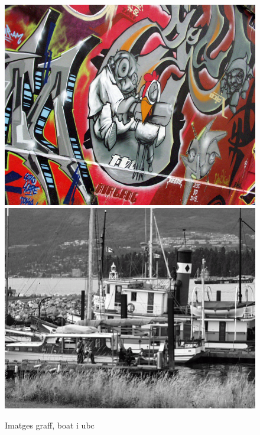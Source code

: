 		\begin{figure}[!htb]
				\includegraphics[width=\linewidth]{images/experiments/graf3}
				\label{fig:awesome_image1}
			\endminipage\hfill
				\includegraphics[width=\linewidth]{images/experiments/boat}
				\label{fig:awesome_image2}
			\endminipage
			\caption{Imatges graff, boat i ubc}
		\end{figure}
